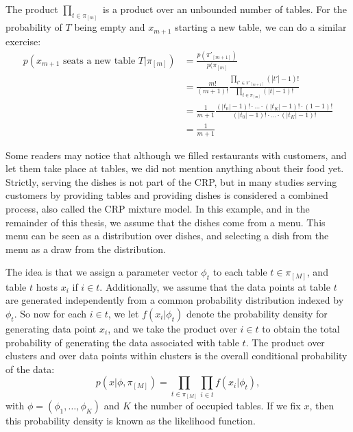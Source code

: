 The product $\prod_{t\in\pi_{[m]}}$ is a product over an unbounded number of tables. For the probability of $T$ being empty and $x_{m+1}$ starting a new table, we can do a similar exercise:
\begin{equation}
\begin{split}
	p(x_{m+1}\text{ seats a new table }T|\pi_{[m]}) &= \frac{p(\pi'_{[m+1]})}{p(\pi_{[m]}} \\
    &= \frac{m!}{(m+1)!}\frac{\prod_{t'\in\pi'_{[m+1]}}(|t'|-1)!}{\prod_{t\in\pi_{[m]}}(|t|-1)!} \\
    &= \frac{1}{m+1}\frac{(|t_0|-1)! \cdot\ldots\cdot (|t_K|-1)! \cdot (1-1)!}{(|t_0|-1)! \cdot\ldots\cdot (|t_K|-1)!} \\
	&= \frac{1}{m+1}
\end{split}
\end{equation}

Some readers may notice that although we filled restaurants with customers, and let them take place at tables, we did not mention anything about their food yet. Strictly, serving the dishes is not part of the CRP, but in many studies serving customers by providing tables and providing dishes is considered a combined process, also called the CRP mixture model. In this example, and in the remainder of this thesis, we assume that the dishes come from a menu. This menu can be seen as a distribution over dishes, and selecting a dish from the menu as a draw from the distribution.

The idea is that we assign a parameter vector $\phi_t$ to each table $t\in\pi_{[M]}$, and table $t$ hosts $x_i$ if $i\in t$. Additionally, we assume that the data points at table $t$ are generated independently from a common probability distribution indexed by $\phi_t$. So now for each $i\in t$, we let $f(x_i|\phi_t)$ denote the probability density for generating data point $x_i$, and we take the product over $i\in t$ to obtain the total probability of generating the data associated with table $t$. The product over clusters and over data points within clusters is the overall conditional probability of the data:
\begin{equation}
	p(x|\phi,\pi_{[M]}) = \prod_{t\in\pi_{[M]}}\prod_{i\in t} f(x_i|\phi_t),
\end{equation}
with $\phi=(\phi_1,\ldots,\phi_K)$ and $K$ the number of occupied tables. If we fix $x$, then this probability density is known as the likelihood function.

